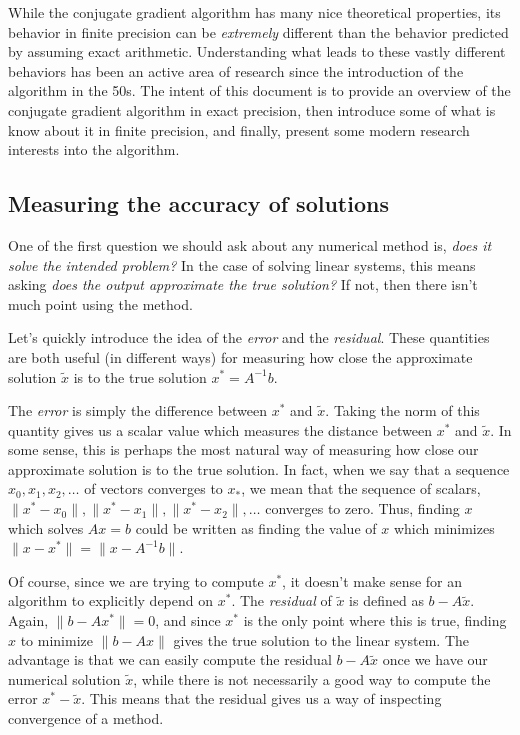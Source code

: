 \documentclass[10pt]{article}
\begin{document}
While the conjugate gradient algorithm has many nice theoretical properties, its behavior in finite precision can be \emph{extremely} different than the behavior predicted by assuming exact arithmetic.
Understanding what leads to these vastly different behaviors has been an active area of research since the introduction of the algorithm in the 50s.
The intent of this document is to provide an overview of the conjugate gradient algorithm in exact precision, then introduce some of what is know about it in finite precision, and finally, present some modern research interests into the algorithm.

\subsection{Measuring the accuracy of solutions}

One of the first question we should ask about any numerical method is, \emph{does it solve the intended problem?} In the case of solving linear systems, this means asking \emph{does the output approximate the true solution?}
If not, then there isn't much point using the method.

Let's quickly introduce the idea of the \emph{error} and the \emph{residual}.
These quantities are both useful (in different ways) for measuring how close the approximate solution \(\tilde{x}\) is to the true solution \(x^* = A^{-1}b\).

The \emph{error} is simply the difference between \(x^*\) and \(\tilde{x}\).
Taking the norm of this quantity gives us a scalar value which measures the distance between \(x^*\) and \(\tilde{x}\).
In some sense, this is perhaps the most natural way of measuring how close our approximate solution is to the true solution.
In fact, when we say that a sequence \(x_0,x_1,x_2,\ldots\) of vectors converges to \(x_*\), we mean that the sequence of scalars, \(\|x^*-x_0\|,\|x^*-x_1\|,\|x^*-x_2\|,\ldots\) converges to zero.
Thus, finding \(x\) which solves \(Ax=b\) could be written as finding the value of \(x\) which minimizes \(\|x - x^*\| = \|x-A^{-1}b\|\).

Of course, since we are trying to compute \(x^*\), it doesn't make sense for an algorithm to explicitly depend on \(x^*\).
The \emph{residual} of \(\tilde{x}\) is defined as \(b-A\tilde{x}\).
Again, \(\|b-Ax^*\| = 0\), and since \(x^*\) is the only point where this is true, finding \(x\) to minimize \(\|b-Ax\|\) gives the true solution to the linear system.
The advantage is that we can easily compute the residual \(b-A\tilde{x}\) once we have our numerical solution \(\tilde{x}\), while there is not necessarily a good way to compute the error \(x^*-\tilde{x}\).
This means that the residual gives us a way of inspecting convergence of a method.
\end{document}
